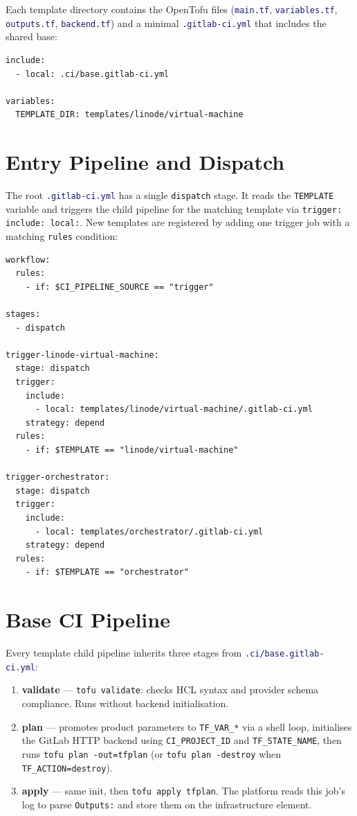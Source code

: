 \documentclass[12pt,a4paper,twoside]{report}
\newcommand{\code}[1]{\texttt{#1}}
\newcommand{\file}[1]{\texttt{\textcolor{MidnightBlue}{#1}}}
\begin{document}
Each template directory contains the OpenTofu files
(\file{main.tf}, \file{variables.tf}, \file{outputs.tf},
\file{backend.tf}) and a minimal \file{.gitlab-ci.yml} that includes
the shared base:

\begin{lstlisting}[style=yaml,caption={Minimal template .gitlab-ci.yml}]
include:
  - local: .ci/base.gitlab-ci.yml

variables:
  TEMPLATE_DIR: templates/linode/virtual-machine
\end{lstlisting}

\section{Entry Pipeline and Dispatch}

The root \file{.gitlab-ci.yml} has a single \code{dispatch} stage.
It reads the \code{TEMPLATE} variable and triggers the child pipeline
for the matching template via \code{trigger: include: local:}. New
templates are registered by adding one trigger job with a matching
\code{rules} condition:

\begin{lstlisting}[style=yaml,caption={Entry pipeline — root .gitlab-ci.yml (excerpt)}]
workflow:
  rules:
    - if: $CI_PIPELINE_SOURCE == "trigger"

stages:
  - dispatch

trigger-linode-virtual-machine:
  stage: dispatch
  trigger:
    include:
      - local: templates/linode/virtual-machine/.gitlab-ci.yml
    strategy: depend
  rules:
    - if: $TEMPLATE == "linode/virtual-machine"

trigger-orchestrator:
  stage: dispatch
  trigger:
    include:
      - local: templates/orchestrator/.gitlab-ci.yml
    strategy: depend
  rules:
    - if: $TEMPLATE == "orchestrator"
\end{lstlisting}

\section{Base CI Pipeline}

Every template child pipeline inherits three stages from
\file{.ci/base.gitlab-ci.yml}:

\begin{enumerate}
  \item \textbf{validate} — \code{tofu validate}: checks HCL syntax and
        provider schema compliance. Runs without backend initialisation.
  \item \textbf{plan} — promotes product parameters to
        \code{TF\_VAR\_*} via a shell loop, initialises the GitLab HTTP
        backend using \code{CI\_PROJECT\_ID} and \code{TF\_STATE\_NAME},
        then runs \code{tofu plan -out=tfplan} (or
        \code{tofu plan -destroy} when \code{TF\_ACTION=destroy}).
  \item \textbf{apply} — same init, then \code{tofu apply tfplan}.
        The platform reads this job's log to parse \code{Outputs:} and
        store them on the infrastructure element.
\end{enumerate}
\end{document}
